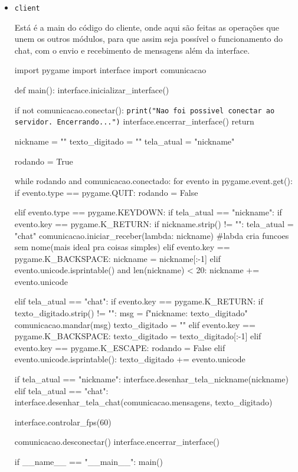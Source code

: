 \begin{itemize}
		\item \texttt{client}
		
		Está é a main do código do cliente, onde aqui são feitas as operações que unem os outros módulos, para que assim seja possível o funcionamento do chat, com o envio e recebimento de mensagens além da interface.
		
		\begin{pycode}
			import pygame
			import interface
			import comunicacao
			
			def main():
			interface.inicializar_interface()
			
			if not comunicacao.conectar():
			\texttt{print("Nao foi possivel conectar ao servidor. Encerrando...")}
			interface.encerrar_interface()
			return
			
			nickname = ""
			texto_digitado = ""
			tela_atual = "nickname"
			
			rodando = True
			
			while rodando and comunicacao.conectado: 
			for evento in pygame.event.get():
			if evento.type == pygame.QUIT:
			rodando = False
			
			elif evento.type == pygame.KEYDOWN:
			if tela_atual == "nickname":
			if evento.key == pygame.K_RETURN:
			if nickname.strip() != "":
			tela_atual = "chat"
			comunicacao.iniciar_receber(lambda: nickname) #labda cria funcoes sem nome(mais ideal pra coisas simples)
			elif evento.key == pygame.K_BACKSPACE:
			nickname = nickname[:-1]
			elif evento.unicode.isprintable() and len(nickname) < 20:
			nickname += evento.unicode
			
			elif tela_atual == "chat":
			if evento.key == pygame.K_RETURN:
			if texto_digitado.strip() != "":
			msg = f"{nickname}: {texto_digitado}"
			comunicacao.mandar(msg)
			texto_digitado = ""
			elif evento.key == pygame.K_BACKSPACE:
			texto_digitado = texto_digitado[:-1]
			elif evento.key == pygame.K_ESCAPE:
			rodando = False
			elif evento.unicode.isprintable():
			texto_digitado += evento.unicode
			
			if tela_atual == "nickname":
			interface.desenhar_tela_nickname(nickname)
			elif tela_atual == "chat":
			interface.desenhar_tela_chat(comunicacao.mensagens, texto_digitado)
			
			interface.controlar_fps(60)
			
			comunicacao.desconectar()
			interface.encerrar_interface()
			
			if __name__ == "__main__":
			main()
		\end{pycode}
	\end{itemize}
	
